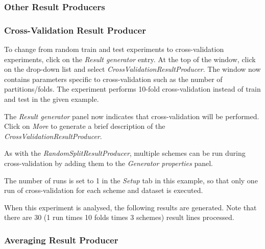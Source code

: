 \subsubsection{Other Result Producers}

\subsubsection*{Cross-Validation Result Producer}

To change from random train and test experiments to cross-validation experiments, click on the \textit{Result generator} entry. At the top of the window, click on the drop-down list and select \textit{CrossValidationResultProducer}. The window now contains parameters specific to cross-validation such as the number of partitions/folds. The experiment performs 10-fold cross-validation instead of train and test in the given example.
\begin{center}
\end{center}

The \textit{Result generator} panel now indicates that cross-validation will be performed. Click on \textit{More} to generate a brief description of the \textit{CrossValidationResultProducer}.
\begin{center}
\end{center}

As with the \textit{RandomSplitResultProducer}, multiple schemes can be run during cross-validation by adding them to the \textit{Generator properties} panel.
\begin{center}
\end{center}

The number of runs is set to 1 in the \textit{Setup} tab in this example, so that only one run of cross-validation for each scheme and dataset is executed.

When this experiment is analysed, the following results are generated. Note that there are 30 (1 run times 10 folds times 3 schemes) result lines processed.
\begin{center}
\end{center}


\subsubsection*{Averaging Result Producer}

